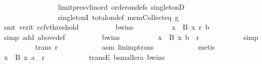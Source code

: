 \begin{isabellebody}
\ \ \ \ \ \ \ \ \ \ \ \ \ \ \ \ limit{\isacharunderscore}{\kern0pt}presv{\isacharunderscore}{\kern0pt}lin{\isacharunderscore}{\kern0pt}ord\ order{\isacharunderscore}{\kern0pt}on{\isacharunderscore}{\kern0pt}defs{\isacharparenleft}{\kern0pt}{}{\isacharparenright}{\kern0pt}\ singletonD\isanewline
\ \ \ \ \ \ \ \ \ \ \ \ \ \ \ \ singletonI\ total{\isacharunderscore}{\kern0pt}on{\isacharunderscore}{\kern0pt}def\ mem{\isacharunderscore}{\kern0pt}Collect{\isacharunderscore}{\kern0pt}eq\ g{}\isanewline
\ \ \ \ \ \ \ \ \ \ \isamarkupfalse%
\ {\isacharparenleft}{\kern0pt}smt\ {\isacharparenleft}{\kern0pt}verit{\isacharcomma}{\kern0pt}\ ccfv{\isacharunderscore}{\kern0pt}threshold{\isacharparenright}{\kern0pt}{\isacharparenright}{\kern0pt}\isanewline
\ \ \ \ \ \ \ \ \isamarkupfalse%
\ b{\isacharunderscore}{\kern0pt}wins{}{\isacharcolon}{\kern0pt}\isanewline
\ \ \ \ \ \ \ \ \ \ {\isachardoublequoteopen}{\isasymforall}x\ {\isasymin}\ B{\isachardot}{\kern0pt}\ x\ {\isasympreceq}\isactrlsub r\ b{\isachardoublequoteclose}\isanewline
\ \ \ \ \ \ \ \ \ \ \isamarkupfalse%
\ {\isacharparenleft}{\kern0pt}simp\ add{\isacharcolon}{\kern0pt}\ above{\isacharunderscore}{\kern0pt}def{\isacharparenright}{\kern0pt}\isanewline
\ \ \ \ \ \ \ \ \isamarkupfalse%
\ b{\isacharunderscore}{\kern0pt}wins{}{\isacharunderscore}{\kern0pt}{}{\isacharcolon}{\kern0pt}\isanewline
\ \ \ \ \ \ \ \ \ \ {\isachardoublequoteopen}{\isasymforall}x\ {\isasymin}\ B{\isachardot}{\kern0pt}\ {\isacharparenleft}{\kern0pt}x{\isacharcomma}{\kern0pt}\ b{\isacharparenright}{\kern0pt}\ {\isasymin}\ r{\isachardoublequoteclose}\isanewline
\ \ \ \ \ \ \ \ \ \ \isamarkupfalse%
\ simp\isanewline
\ \ \ \ \ \ \ \ \isamarkupfalse%
\ {\isachardoublequoteopen}trans\ r{\isachardoublequoteclose}\isanewline
\ \ \ \ \ \ \ \ \ \ \isamarkupfalse%
\ asm\ lin{\isacharunderscore}{\kern0pt}imp{\isacharunderscore}{\kern0pt}trans\isanewline
\ \ \ \ \ \ \ \ \ \ \isamarkupfalse%
\ metis\isanewline
\ \ \ \ \ \ \ \ \isamarkupfalse%
\ {\isachardoublequoteopen}{\isasymforall}x\ {\isasymin}\ B{\isachardot}{\kern0pt}\ {\isacharparenleft}{\kern0pt}x{\isacharcomma}{\kern0pt}\ a{\isacharparenright}{\kern0pt}\ {\isasymin}\ r{\isachardoublequoteclose}\isanewline
\ \ \ \ \ \ \ \ \ \ \isamarkupfalse%
\ transE\ b{\isacharunderscore}{\kern0pt}smaller{\isacharunderscore}{\kern0pt}a{\isacharunderscore}{\kern0pt}{}\ b{\isacharunderscore}{\kern0pt}wins{}{\isacharunderscore}{\kern0pt}{}\isanewline

\end{isabellebody}
